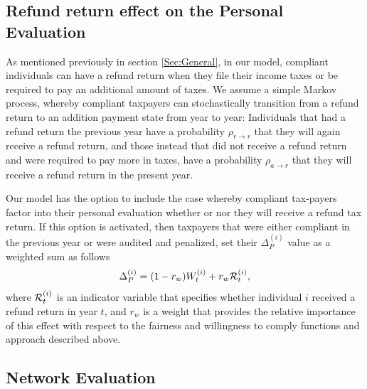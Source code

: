 \documentclass{NSF_proposal_mod}
\begin{document}
\subsection{Refund return effect on the Personal Evaluation} 
\label{Sec:Refund_return}

As mentioned previously in section \ref{Sec:General}, in our model, compliant individuals can have a refund return when they file their income taxes or be required to pay an additional amount of taxes.  We assume a simple Markov process, whereby compliant taxpayers can stochastically transition from a refund return to an addition payment state from year to year: Individuals that had a refund return the previous year have a probability $\rho_{r\to r}$ that they will again receive a refund return, and those instead that did not receive a refund return and  were required to pay more in taxes, have a probability $\rho_{a\to r}$ that they will receive a refund return in the present year. 

Our model has the option to include the case whereby compliant tax-payers factor into their  personal evaluation whether or nor they will receive a refund tax return. If this option is activated, then  taxpayers that were either compliant in the previous year or were audited and penalized, set their   $\Delta_P^{(i)}$ value as a weighted sum as follows
\begin{equation}
\Delta_P^{(i)} = (1-r_w) W^{(i)}_t + r_w {\cal R}^{(i)}_t,
\end{equation}
where ${\cal R}^{(i)}_t$ is an indicator variable that specifies whether individual $i$ received a refund return in year $t$, and $r_w$ is a weight  that provides the relative importance of this effect with respect to the fairness and willingness to comply functions and approach described above. %

\subsection{Network Evaluation}
\label{Sec:Network_Evaluation}
\end{document}
